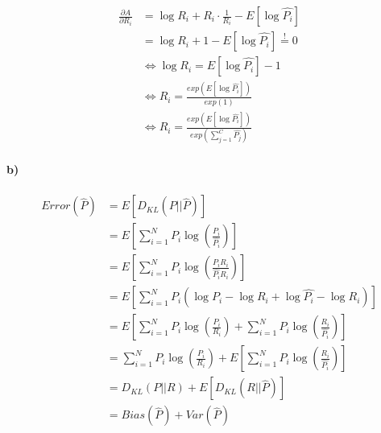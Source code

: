 \documentclass[12pt]{article}
\newcommand{\myexp}[1]{E\left[#1\right]}
\newcommand{\kbd}[2]{D_{KL}(#1||#2)}
\newcommand{\mysum}{\sum_{i=1}^N}
\begin{document}
\begin{equation}
\begin{split}
\frac{\partial A}{\partial R_i}
&= \log R_i + R_i \cdot \frac{1}{R_i} - \myexp{\log \hat{P_i}}\\
&= \log R_i + 1 - \myexp{\log \hat{P_i}} \stackrel{!}{=} 0\\
&\Leftrightarrow \log R_i = \myexp{\log \hat{P_i}} - 1\\
&\Leftrightarrow R_i = \frac{exp(\myexp{\log \hat{P_i}})}{exp(1)}\\
&\Leftrightarrow R_i = \frac{exp(\myexp{\log \hat{P_i}})}
                            {exp(\sum_{j=1}^C \hat{P_j})}
\end{split}
\end{equation}

\paragraph{b)}
\begin{equation}
\begin{split}
Error\left(\hat{P}\right)
&= \myexp{\kbd{P}{\hat{P}}}\\
&= \myexp{\mysum P_i \log\left(\frac{P_i}{\hat{P_i}}\right)}\\
&= \myexp{\mysum P_i \log\left(\frac{P_iR_i}{\hat{P_i}R_i}\right)}\\
&= \myexp{\mysum P_i\left(\log P_i-\log R_i + \log \hat{P_i} - \log R_i\right)}\\
&= \myexp{\mysum P_i \log\left(\frac{P_i}{R_i}\right) +
   \mysum P_i \log\left(\frac{R_i}{\hat{P_i}}\right)}\\
&= \mysum P_i \log\left(\frac{P_i}{R_i}\right) +
   \myexp{\mysum P_i \log\left(\frac{R_i}{\hat{P_i}}\right)}\\
&= \kbd{P}{R} + \myexp{\kbd{R}{\hat{P}}}\\
&= Bias\left(\hat{P}\right) + Var\left(\hat{P}\right)
\end{split}
\end{equation}
\end{document}
